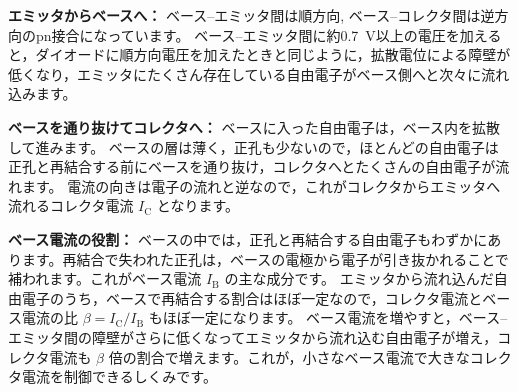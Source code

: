 \begin{column}
\begin{center}
\begin{minipage}{\linewidth}
  \label{fig:transistor-npn-flow}
  \end{minipage}
\end{center}

\textbf{エミッタからベースへ：}\quad
ベース–エミッタ間は順方向, ベース–コレクタ間は逆方向のpn接合になっています。
ベース–エミッタ間に約\SI{0.7}{V}以上の電圧を加えると，ダイオードに順方向電圧を加えたときと同じように，拡散電位による障壁が低くなり，エミッタにたくさん存在している自由電子がベース側へと次々に流れ込みます。

\textbf{ベースを通り抜けてコレクタへ：}\quad
ベースに入った自由電子は，ベース内を拡散して進みます。
ベースの層は薄く，正孔も少ないので，ほとんどの自由電子は正孔と再結合する前にベースを通り抜け，コレクタへとたくさんの自由電子が流れます。
電流の向きは電子の流れと逆なので，これがコレクタからエミッタへ流れるコレクタ電流 $I_\mathrm{C}$ となります。

\textbf{ベース電流の役割：}\quad
ベースの中では，正孔と再結合する自由電子もわずかにあります。再結合で失われた正孔は，ベースの電極から電子が引き抜かれることで補われます。これがベース電流 $I_\mathrm{B}$ の主な成分です。
エミッタから流れ込んだ自由電子のうち，ベースで再結合する割合はほぼ一定なので，コレクタ電流とベース電流の比 $\beta=I_\mathrm{C}/I_\mathrm{B}$ もほぼ一定になります。
ベース電流を増やすと，ベース–エミッタ間の障壁がさらに低くなってエミッタから流れ込む自由電子が増え，コレクタ電流も $\beta$ 倍の割合で増えます。これが，小さなベース電流で大きなコレクタ電流を制御できるしくみです。

\end{column}

